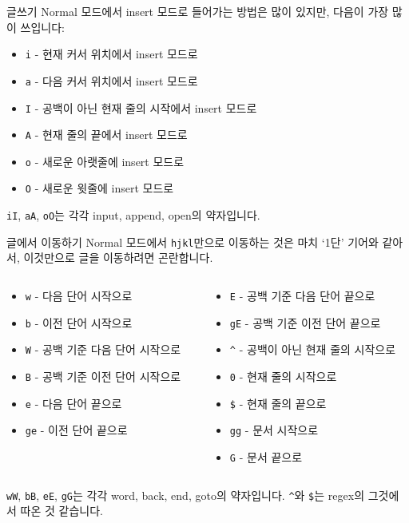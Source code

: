 \documentclass{beamer}
\begin{document}
\begin{frame}[fragile]{글쓰기}
  Normal 모드에서 insert 모드로 들어가는 방법은 많이 있지만, 다음이 가장
  많이 쓰입니다:
  \begin{itemize}
    \item \verb/i/ - 현재 커서 위치에서 insert 모드로\pause
    \item \verb/a/ - 다음 커서 위치에서 insert 모드로\pause
    \item \verb/I/ - 공백이 아닌 현재 줄의 시작에서 insert 모드로\pause
    \item \verb/A/ - 현재 줄의 끝에서 insert 모드로\pause
    \item \verb/o/ - 새로운 아랫줄에 insert 모드로
    \item \verb/O/ - 새로운 윗줄에 insert 모드로\pause
  \end{itemize}

  \verb/iI/, \verb/aA/, \verb/oO/는 각각 \alert{i}nput, \alert{a}ppend,
  \alert{open}의 약자입니다.
\end{frame}

\begin{frame}[fragile]{글에서 이동하기}
  Normal 모드에서 \verb/hjkl/만으로 이동하는 것은 마치 `1단' 기어와 같아서,
  이것만으로 글을 이동하려면 곤란합니다.
  \begin{columns}
    \begin{column}{0.6\linewidth}
      \begin{itemize}
        \item \verb/w/ - 다음 단어 시작으로\pause
        \item \verb/b/ - 이전 단어 시작으로\pause
        \item \verb/W/ - 공백 기준 다음 단어 시작으로
        \item \verb/B/ - 공백 기준 이전 단어 시작으로\pause
        \item \verb/e/ - 다음 단어 끝으로
        \item \verb/ge/ - 이전 단어 끝으로
      \end{itemize}
    \end{column}
    \begin{column}{0.6\linewidth}
      \begin{itemize}
        \item \verb/E/ - 공백 기준 다음 단어 끝으로
        \item \verb/gE/ - 공백 기준 이전 단어 끝으로\pause
        \item \verb/^/ - 공백이 아닌 현재 줄의 시작으로
        \item \verb/0/ - 현재 줄의 시작으로
        \item \verb/$/ - 현재 줄의 끝으로
        \item \verb/gg/ - 문서 시작으로\pause
        \item \verb/G/ - 문서 끝으로\pause
      \end{itemize}
    \end{column}
  \end{columns}
  \verb/wW/, \verb/bB/, \verb/eE/, \verb/gG/는 각각 \alert{w}ord, \alert{b}ack,
  \alert{e}nd, \alert{g}oto의 약자입니다.
  {\color{gray}\verb|^|와 \verb/$/는 regex의 그것에서 따온 것 같습니다.}
\end{frame}
\end{document}
